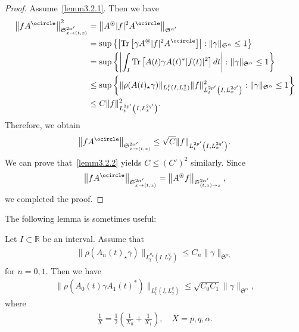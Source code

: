 \documentclass[AHL,Unicode,longabstracts,MathTools,published]{cedram}
\newcommand{\oast}{\circledast}
\newcommand{\FS}{\mathfrak{S}}
\newcommand{\al}{\alpha}
\newcommand{\ga}{\gamma}
\newcommand{\rh}{\rho}
\newcommand{\K}[1]{\left(#1\right)}
\newcommand{\abs}[1]{\left|#1\right|}
\DeclareMathOperator{\Tr}{Tr}
\newcommand{\Sxtx}{{\FS^{2\al'}_{x \to (t,x)}}}
\newcommand{\Stxx}{{\FS^{2\al'}_{(t,x) \to x}}}
\newcommand{\st}{\star}
\newcommand{\R}{\mathbb{R}}
\newcommand{\oc}{\ocircle}
\newcommand{\os}{\oast}
\begin{document}
\begin{proof}
Assume~\eqref{lemm3.2.1}. Then we have
\begin{equation}
\begin{split}
\left\|f A^\oc\right\|_\Sxtx^2 &= \left\|A^\os |f|^2 A^\oc\right\|_{\FS^{\al'}} \\
&= \sup \left\{ \left|\Tr\left[\ga A^\os |f|^2 A^\oc\right]\right | : \|\ga\|_{\FS^\al} \le 1\right\} \\
&= \sup \left \{ \abs{\int_I \Tr\left[A(t) \ga A(t)^* |f(t)|^2\right]dt } : \|\ga\|_{\FS^\al} \le 1 \right \} \\
&\le \sup \left \{ \|\rh(A(t)_\st \ga)\|_{L^p_t\left(I,L^q_x\right)} \|f\|_{L^{2p'}_t\left(I,L^{2q'}_x\right)}^2 : \|\ga\|_{\FS^\al} \le 1 \right \} \\
&\le C \|f\|_{L^{2p'}_t\left(I,L^{2q'}_x\right)}^2.
\end{split}
\end{equation}
Therefore, we obtain
\begin{align}
\left\|f A^\oc\right\|_\Sxtx \le \sqrt{C} \|f\|_{L^{2p'}_t\left(I,L^{2q'}_x\right)}.
\end{align}
We can prove that~\eqref{lemm3.2.2} yields $C \le (C')^2$ similarly. Since
\begin{align}
\left\|f A^\oc\right\|_{\Sxtx} = \left\|A^\os f\right\|_{\Stxx},
\end{align}
we completed the proof.
\end{proof}

The following lemma is sometimes useful:

\begin{lemm}\label{asym}
Let $I \subset \R$ be an interval. Assume that
\begin{align}
\|\rh(A_n(t)_\st \ga)\|_{L^{p_n}_t \left(I,L^{q_n}_x\right)} \le C_n \|\ga\|_{\FS^{\al_n}}
\end{align}
for $n=0,1$. Then we have
\begin{align}
\big\|\rh(A_0(t) \ga A_1(t)^*)\big\|_{L^p_t\left(I,L^q_x\right)} \le \sqrt{C_0 C_1} \|\ga\|_{\FS^\al},
\end{align}
where
\begin{align}
\frac{1}{X} = \frac{1}{2} \K{\frac{1}{X_0}+ \frac{1}{X_1}}, \quad X = p,q,\al.
\end{align}
\end{lemm}
\end{document}

